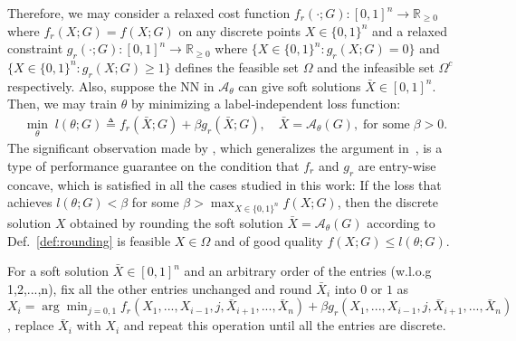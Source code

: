 Therefore, we may consider a relaxed cost function $f_r(\cdot;G):[0,1]^n \rightarrow \mathbb{R}_{\geq0}$ where $f_r(X;G)=f(X;G)$ on any discrete points $X\in\{0,1\}^n$ and a relaxed constraint $g_r(\cdot;G):[0,1]^n \rightarrow \mathbb{R}_{\geq0}$ where $\{X\in\{0,1\}^n: g_r(X;G) = 0\}$ and $\{X\in\{0,1\}^n: g_r(X;G) \geq 1\}$ defines the feasible set $\Omega$ and the infeasible set $\Omega^c$ respectively. Also, suppose the NN in $\mathcal{A}_{\theta}$ can give soft solutions $\bar{X}\in[0,1]^n$. Then, we may train $\theta$ by minimizing a label-independent loss function:
\begin{equation}
\label{eq:relax}
\begin{aligned}
\min_{\theta}\; l(\theta;G) \triangleq f_r(\bar{X};G) + \beta g_r(\bar{X};G) , \quad \bar{X} = \mathcal{A}_{\theta}(G),\;\text{for some}\;\beta>0.
\end{aligned}
\end{equation}
The significant observation made by \citep{wang2022unsupervised}, which generalizes the argument in~\citep{karalias2020erdos}, is a type of performance guarantee on the condition that $f_r$ and $g_r$ are entry-wise concave, which is satisfied in all the cases studied in this work: If the loss that achieves $l(\theta;G)<\beta$ for some $\beta > \max_{X\in\{0,1\}^n} f(X;G)$, then the discrete solution $X$ obtained by rounding the soft solution $\bar{X}=\mathcal{A}_{\theta}(G)$ according to Def.~\ref{def:rounding} is feasible $X\in\Omega$ and of good quality $f(X;G) \leq l(\theta;G)$.
\begin{definition}[Rounding]
\label{def:rounding}
For a soft solution $\bar{X} \in [0,1]^n$ and an arbitrary order of the entries (w.l.o.g 1,2,...,n), fix all the other entries unchanged and round $\bar{X}_i$ into $0$ or $1$ as $X_i = \arg\min_{j=0,1} f_r(X_1,...,X_{i-1},j,\bar{X}_{i+1},...,\bar{X}_n)+\beta g_r(X_1,...,X_{i-1},j,\bar{X}_{i+1},...,\bar{X}_n)$, replace $\bar{X}_i$ with $X_i$ and repeat this operation until all the entries are discrete.
\end{definition}

